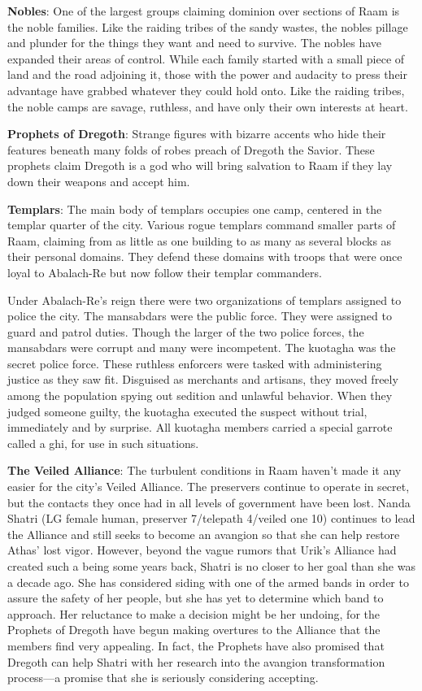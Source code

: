 {	\textbf{Nobles}: One of the largest groups claiming dominion over sections of Raam is the noble families. Like the raiding tribes of the sandy wastes, the nobles pillage and plunder for the things they want and need to survive. The nobles have expanded their areas of control. While each family started with a small piece of land and the road adjoining it, those with the power and audacity to press their advantage have grabbed whatever they could hold onto. Like the raiding tribes, the noble camps are savage, ruthless, and have only their own interests at heart.

	\textbf{Prophets of Dregoth}: Strange figures with bizarre accents who hide their features beneath many folds of robes preach of Dregoth the Savior. These prophets claim Dregoth is a god who will bring salvation to Raam if they lay down their weapons and accept him.

	\textbf{Templars}: The main body of templars occupies one camp, centered in the templar quarter of the city. Various rogue templars command smaller parts of Raam, claiming from as little as one building to as many as several blocks as their personal domains. They defend these domains with troops that were once loyal to Abalach-Re but now follow their templar commanders.

	Under Abalach-Re's reign there were two organizations of templars assigned to police the city. The mansabdars were the public force. They were assigned to guard and patrol duties. Though the larger of the two police forces, the mansabdars were corrupt and many were incompetent. The kuotagha was the secret police force. These ruthless enforcers were tasked with administering justice as they saw fit. Disguised as merchants and artisans, they moved freely among the population spying out sedition and unlawful behavior. When they judged someone guilty, the kuotagha executed the suspect without trial, immediately and by surprise. All kuotagha members carried a special garrote called a ghi, for use in such situations.

	\textbf{The Veiled Alliance}: The turbulent conditions in Raam haven't made it any easier for the city's Veiled Alliance. The preservers continue to operate in secret, but the contacts they once had in all levels of government have been lost. Nanda Shatri (LG female human, preserver 7/telepath 4/veiled one 10) continues to lead the Alliance and still seeks to become an avangion so that she can help restore Athas' lost vigor. However, beyond the vague rumors that Urik's Alliance had created such a being some years back, Shatri is no closer to her goal than she was a decade ago. She has considered siding with one of the armed bands in order to assure the safety of her people, but she has yet to determine which band to approach. Her reluctance to make a decision might be her undoing, for the Prophets of Dregoth have begun making overtures to the Alliance that the members find very appealing. In fact, the Prophets have also promised that Dregoth can help Shatri with her research into the avangion transformation process---a promise that she is seriously considering accepting.
}
